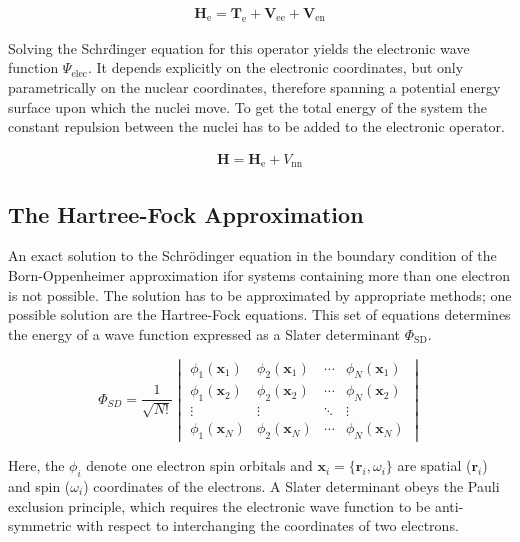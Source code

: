 \begin{align}
    \mathbf{H}_\text{e}=\mathbf{T}_\text{e} + \mathbf{V}_\text{ee} + \mathbf{V}_\text{en}
\end{align}

Solving the Schr\"dinger equation for this operator yields the electronic wave
function $\Psi_\text{elec}$. It depends explicitly on the electronic
coordinates, but only parametrically on the nuclear coordinates, therefore
spanning a potential energy surface upon which the nuclei move. To get the
total energy of the system the constant repulsion between the nuclei has to be
added to the electronic operator.

\begin{align}
    \mathbf{H}=\mathbf{H}_\text{e}+V_\text{nn}
\end{align}

\subsection{The Hartree-Fock Approximation}

An exact solution to the Schr\"odinger equation in the boundary condition of
the Born-Oppenheimer approximation ifor systems containing more than one
electron is not possible. The solution has to be approximated by appropriate
methods; one possible solution are the Hartree-Fock equations. This set of
equations determines the energy of a wave function expressed as a Slater
determinant $\Phi_\text{SD}$.

\begin{equation}
     \Phi_{SD}=\frac{1}{\sqrt{N!}}
     \begin{vmatrix}
         \phi_1(\mathbf{x}_1) & \phi_2(\mathbf{x}_1) & \cdots & \phi_N(\mathbf{x}_1)\\
         \phi_1(\mathbf{x}_2) & \phi_2 (\mathbf{x}_2) & \cdots & \phi_N(\mathbf{x}_2)\\
         \vdots & \vdots & \ddots & \vdots\\
         \phi_1(\mathbf{x}_N) & \phi_2(\mathbf{x}_N) & \cdots & \phi_N(\mathbf{x}_N)
     \end{vmatrix}
     \label{eqn:SlaterDet}
\end{equation}

Here, the $\phi_i$ denote one electron spin orbitals and
$\mathbf{x}_i=\{\mathbf{r}_i,\omega_i\}$ are spatial ($\mathbf{r}_i$) and spin
($\omega_i$) coordinates of the electrons. A Slater determinant obeys the Pauli
exclusion principle, which requires the electronic wave function to be
anti-symmetric with respect to interchanging the coordinates of two electrons.
